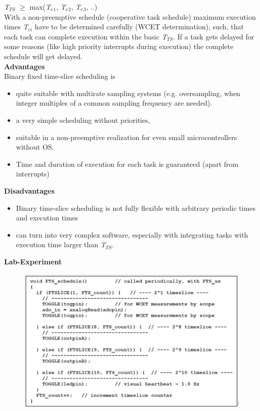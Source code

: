 \textit{   T${}_{TS}$} $\mathrm{\ge}$ max(\textit{T${}_{e}$}${}_{1}$,\textit{ T${}_{e}$}${}_{2}$,\textit{ T${}_{e}$}${}_{3}$, ..)\\

With a non-preemptive schedule (cooperative task schedule) maximum execution times \textit{T${}_{ei}$} have to be determined carefully (WCET determination), such, that each task can complete execution within the basic \textit{T${}_{TS}$}. If a task gets delayed for some reasons (like high priority interrupts during execution) the complete schedule will get delayed.\\

\textbf{Advantages }\\

Binary fixed time-slice scheduling is

\begin{itemize}
	\item  quite suitable with multirate sampling systems (e.g. oversampling, when integer multiples of a common sampling frequency are needed).
	\item  a very simple scheduling without priorities,
	\item  suitable in a non-preemptive realization for even small microcontrollers without OS. 
	\item  Time and duration of execution for each task is guaranteed (apart from interrupts)
\end{itemize}

\textbf{Disadvantages }

\begin{itemize}
	\item \textbf{ }Binary time-slice scheduling is not fully flexible with arbitrary periodic times and execution times
	\item  can turn into very complex software, especially with integrating tasks with execution time larger than \textit{T${}_{TS}$}.
\end{itemize}

\textbf{Lab-Experiment}   \textbf{}

	\begin{figure}[h]
    \centering
    \includegraphics[width=13cm, height=7cm]{Images/image95.png}
    \label{fig:Fig }
    \end{figure}

